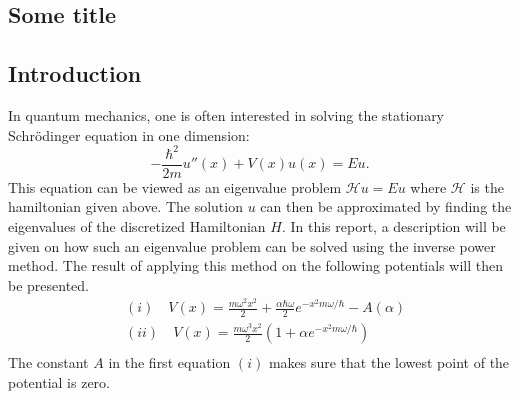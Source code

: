 \documentclass[twocolumn]{article}
\begin{document}
\begin{large}
\section*{Some title}
\subsection*{Introduction}
In quantum mechanics, one is often interested in solving the stationary Schrödinger equation in one dimension:
\begin{equation}
    -\frac{\hbar^2}{2m}u''(x) + V(x)u(x) = Eu.
\end{equation}
This equation can be viewed as an eigenvalue problem $\mathcal{H}u = Eu$ where $\mathcal{H}$ is the hamiltonian given above. The solution $u$ can then be approximated by finding the eigenvalues of the discretized Hamiltonian $H$. In this report, a description will be given on how such an eigenvalue problem can be solved using the inverse power method. The result of applying this method on the following potentials will then be presented. 
\begin{equation*}
    \begin{split}
        &(i) \quad V(x) = \frac{m\omega^2x^2}{2}+\frac{\alpha\hbar\omega}{2}e^{-x^2m\omega/\hbar} - A(\alpha)\\ 
        &(ii) \quad V(x) = \frac{m\omega^3x^2}{2}\left(1+\alpha e^{-x^2m\omega/\hbar}\right) \\ 
    \end{split}
\end{equation*}
The constant $A$ in the first equation $(i)$ makes sure that the lowest point of the potential is zero.  


\end{large}
\end{document}
